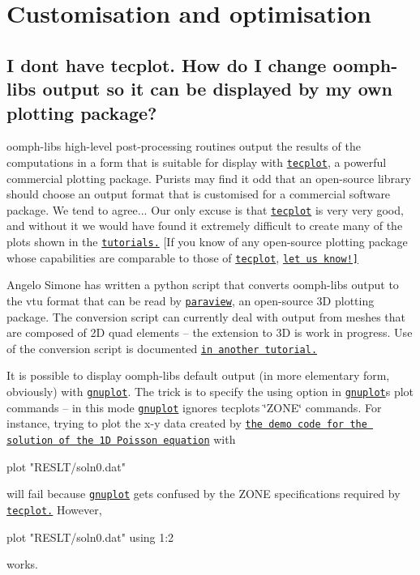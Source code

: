 \hypertarget{index_cust_opt}{}\section{Customisation and optimisation}\label{index_cust_opt}
\hypertarget{index_tecplot}{}\subsection{I don\textquotesingle{}t have tecplot. How do I change oomph-\/lib\textquotesingle{}s output so it can be displayed by my own plotting package?}\label{index_tecplot}
{\ttfamily oomph-\/lib\textquotesingle{}s} high-\/level post-\/processing routines output the results of the computations in a form that is suitable for display with \href{http://www.tecplot.com}{\tt tecplot}, a powerful commercial plotting package. Purists may find it odd that an open-\/source library should choose an output format that is customised for a commercial software package. We tend to agree... Our only excuse is that \href{http://www.tecplot.com}{\tt tecplot} is very very good, and without it we would have found it extremely difficult to create many of the plots shown in the \href{../../example_code_list/html/index.html}{\tt tutorials.} \mbox{[}If you know of any open-\/source plotting package whose capabilities are comparable to those of \href{http://www.tecplot.com}{\tt tecplot}, \href{../../contact/html/index.html}{\tt let us know!\mbox{]}}

Angelo Simone has written a python script that converts {\ttfamily oomph-\/lib\textquotesingle{}s} output to the vtu format that can be read by \href{http://www.paraview.org}{\tt paraview}, an open-\/source 3D plotting package. The conversion script can currently deal with output from meshes that are composed of 2D quad elements -- the extension to 3D is work in progress. Use of the conversion script is documented \href{../../paraview/html/index.html}{\tt in another tutorial.}

It is possible to display {\ttfamily oomph-\/lib\textquotesingle{}s} default output (in more elementary form, obviously) with \href{http://www.gnuplot.info}{\tt gnuplot}. The trick is to specify the {\ttfamily using} option in \href{http://www.gnuplot.info}{\tt gnuplot}\textquotesingle{}s plot commands -- in this mode \href{http://www.gnuplot.info}{\tt gnuplot} ignores tecplot\textquotesingle{}s \char`\"{}\+Z\+O\+N\+E\char`\"{} commands. For instance, trying to plot the x-\/y data created by \href{../../poisson/one_d_poisson/html/index.html}{\tt the demo code for the solution of the 1D Poisson equation} with 
\begin{DoxyCode}
plot \textcolor{stringliteral}{"RESLT/soln0.dat"}
\end{DoxyCode}
 will fail because \href{http://www.gnuplot.info}{\tt gnuplot} gets confused by the {\ttfamily Z\+O\+NE} specifications required by \href{http://www.tecplot.com}{\tt tecplot.} However, 
\begin{DoxyCode}
plot \textcolor{stringliteral}{"RESLT/soln0.dat"} \textcolor{keyword}{using} 1:2
\end{DoxyCode}
 works.

